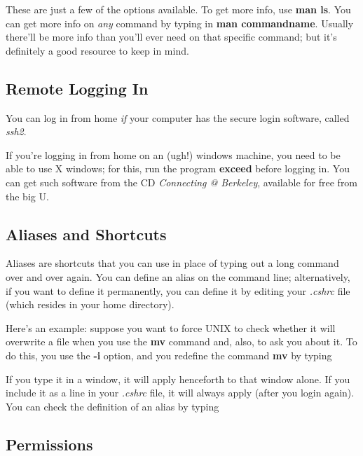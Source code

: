 	These are just a few of the options available.  To get more
info, use {\bf man ls}.  You can get more info on {\it any} command by
typing in {\bf man commandname}.  Usually there'll be more info than
you'll ever need on that specific command; but it's definitely a good
resource to keep in mind. 

\subsection{Remote Logging In}\label{remote}

	You can log in from home {\it if} your computer has the secure
login software, called {\it ssh2}. 


\noindent If you're logging in from home on an (ugh!) windows machine,
you need to be able to use X windows; for this, run the program {\bf
exceed} before logging in. You can get such software  from the CD  {\it
Connecting @ Berkeley}, available for free from the big U.

\subsection{Aliases and Shortcuts}\label{short}
	
	Aliases are shortcuts that you can use in place of typing out a
long command over and over again.  You can define an alias on the
command line; alternatively, if you want to define it permanently, you
can define it by editing your {\it .cshrc} file (which resides in your
home directory). 

	Here's an example: suppose you want to force UNIX to check
whether it will overwrite a file when you use the {\bf mv} command and,
also, to ask you about it. To do this,
you use the {\bf -i} option, and you redefine the command {\bf mv} by
typing


\noindent If you type it in a window, it will apply henceforth to that
window alone.  If you include it as a line in your {\it .cshrc} file, it
will always apply (after you login again).  You can check the definition
of an alias by typing


\subsection{Permissions}\label{perm}

